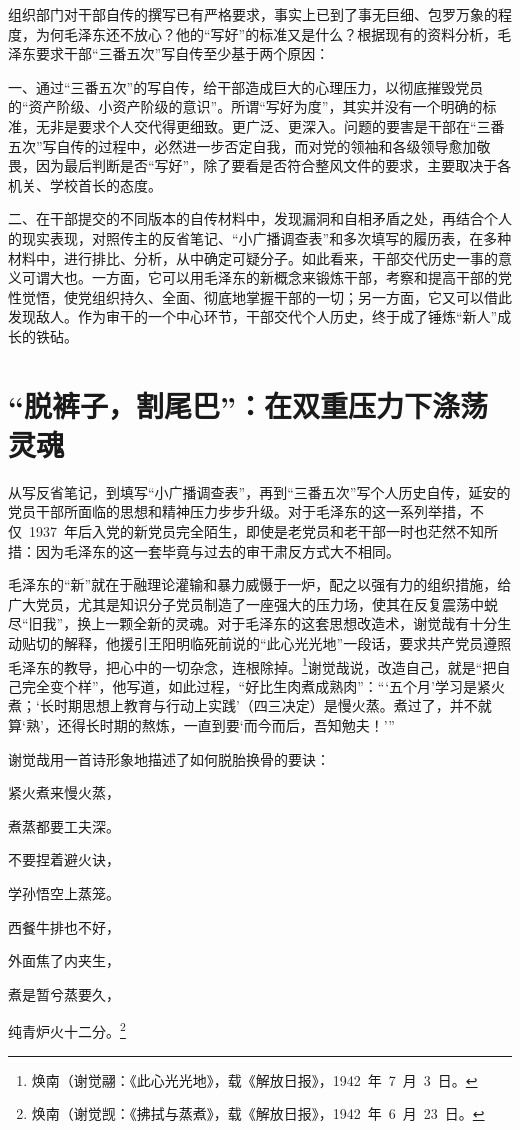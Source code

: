 组织部门对干部自传的撰写已有严格要求，事实上已到了事无巨细、包罗万象的程度，为何毛泽东还不放心？他的“写好”的标准又是什么？根据现有的资料分析，毛泽东要求干部“三番五次”写自传至少基于两个原因：

一、通过“三番五次”的写自传，给干部造成巨大的心理压力，以彻底摧毁党员的“资产阶级、小资产阶级的意识”。所谓“写好为度”，其实并没有一个明确的标准，无非是要求个人交代得更细致。更广泛、更深入。问题的要害是干部在“三番五次”写自传的过程中，必然进一步否定自我，而对党的领袖和各级领导愈加敬畏，因为最后判断是否“写好”，除了要看是否符合整风文件的要求，主要取决于各机关、学校首长的态度。

二、在干部提交的不同版本的自传材料中，发现漏洞和自相矛盾之处，再结合个人的现实表现，对照传主的反省笔记、“小广播调查表”和多次填写的履历表，在多种材料中，进行排比、分析，从中确定可疑分子。如此看来，干部交代历史一事的意义可谓大也。一方面，它可以用毛泽东的新概念来锻炼干部，考察和提高干部的党性觉悟，使党组织持久、全面、彻底地掌握干部的一切；另一方面，它又可以借此发现敌人。作为审干的一个中心环节，干部交代个人历史，终于成了锤炼“新人”成长的铁砧。

\section{“脱裤子，割尾巴”：在双重压力下涤荡灵魂}

从写反省笔记，到填写“小广播调查表”，再到“三番五次”写个人历史自传，延安的党员干部所面临的思想和精神压力步步升级。对于毛泽东的这一系列举措，不仅~1937~年后入党的新党员完全陌生，即使是老党员和老干部一时也茫然不知所措：因为毛泽东的这一套毕竟与过去的审干肃反方式大不相同。

毛泽东的“新”就在于融理论灌输和暴力威慑于一炉，配之以强有力的组织措施，给广大党员，尤其是知识分子党员制造了一座强大的压力场，使其在反复震荡中蜕尽“旧我”，换上一颗全新的灵魂。对于毛泽东的这套思想改造术，谢觉哉有十分生动贴切的解释，他援引王阳明临死前说的“此心光光地”一段话，要求共产党员遵照毛泽东的教导，把心中的一切杂念，连根除掉。\footnote{焕南（谢觉翮：《此心光光地》，载《解放日报》，1942~年~7~月~3~日。}谢觉哉说，改造自己，就是“把自己完全变个样”，他写道，如此过程，“好比生肉煮成熟肉”：“‘五个月’学习是紧火煮；‘长时期思想上教育与行动上实践’（四三决定）是慢火蒸。煮过了，并不就算‘熟’，还得长时期的熬炼，一直到要‘而今而后，吾知勉夫！’”

谢觉哉用一首诗形象地描述了如何脱胎换骨的要诀：

\begin{quoting}
紧火煮来慢火蒸，

煮蒸都要工夫深。

不要捏着避火诀，

学孙悟空上蒸笼。

西餐牛排也不好，

外面焦了内夹生，

煮是暂兮蒸要久，

纯青炉火十二分。\footnote{焕南（谢觉觊：《拂拭与蒸煮》，载《解放日报》，1942~年~6~月~23~日。}
\end{quoting}

